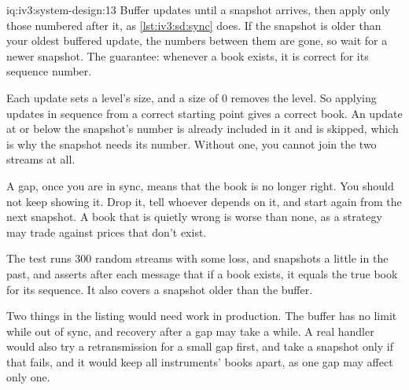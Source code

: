 \begin{solution}{iq:iv3:system-design:13}
Buffer updates until a snapshot arrives, then apply only those numbered after it, as \cref{lst:iv3:sd:sync} does. If the snapshot is older than your oldest buffered update, the numbers between them are gone, so wait for a newer snapshot. The guarantee: whenever a book exists, it is correct for its sequence number.
\label{lst:iv3:sd:sync}

Each update sets a level's size, and a size of 0 removes the level. So applying updates in sequence from a correct starting point gives a correct book. An update at or below the snapshot's number is already included in it and is skipped, which is why the snapshot needs its number. Without one, you cannot join the two streams at all.

A gap, once you are in sync, means that the book is no longer right. You should not keep showing it. Drop it, tell whoever depends on it, and start again from the next snapshot. A book that is quietly wrong is worse than none, as a strategy may trade against prices that don't exist.

The test runs 300 random streams with some loss, and snapshots a little in the past, and asserts after each message that if a book exists, it equals the true book for its sequence. It also covers a snapshot older than the buffer.

Two things in the listing would need work in production. The buffer has no limit while out of sync, and recovery after a gap may take a while. A real handler would also try a retransmission for a small gap first, and take a snapshot only if that fails, and it would keep all instruments' books apart, as one gap may affect only one.

\end{solution}

